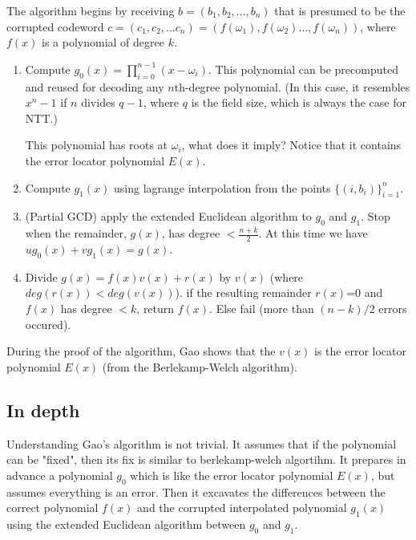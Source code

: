 The algorithm begins by receiving $b=(b_1,b_2,\dots,b_n)$ that is presumed to
be the corrupted codeword $c=(c_1,c_2,\dots c_n)=(f(\omega_1),f(\omega_2)\dots, f(\omega_n))$,
where $f(x)$ is a polynomial of degree $k$.

\begin{enumerate}
    \item Compute $g_0(x)=\prod_{i=0}^{n-1}(x-\omega_i)$. 
    This polynomial can be precomputed and reused for decoding any 
    $n$th-degree polynomial. 
    (In this case, it resembles $x^n-1$ if $n$ divides $q-1$,
    where $q$ is the field size, which is always the case for NTT.) 

    This polynomial has roots at $\omega_i$, what does it imply?
    Notice that it contains the error locator polynomial $E(x)$.

    \item Compute $g_1(x)$ using lagrange interpolation from the points $\{(i,b_i)\}_{i=1}^{n}$.

    \item (Partial GCD) apply the extended Euclidean algorithm to 
    $g_0$ and $g_1$. Stop when the remainder, $g(x)$, has degree $<\frac{n+k}{2}$.
    At this time we have $ug_0(x)+vg_1(x)=g(x)$.

    \item Divide $g(x)=f(x)v(x)+r(x)$ by $v(x)$ (where $deg(r(x))<deg(v(x))$).
    if the resulting remainder $r(x)$=0 and $f(x)$ has degree $<k$, return $f(x)$. Else fail 
    (more than $(n-k)/2$ errors occured).
\end{enumerate}



During the proof of the algorithm, Gao shows that the $v(x)$ is the error 
locator polynomial $E(x)$ (from the Berlekamp-Welch algorithm).

\subsection{In depth}


Understanding Gao's algorithm is not trivial.
It assumes that if the polynomial can be "fixed", then its fix is 
similar to berlekamp-welch algortihm. It prepares in advance 
a polynomial $g_0$ which is like the error locator polynomial $E(x)$,
but assumes everything is an error. 
Then it excavates the differences between the correct polynomial $f(x)$ and the
corrupted interpolated polynomial $g_1(x)$ using the extended Euclidean algorithm
between $g_0$ and $g_1$.

